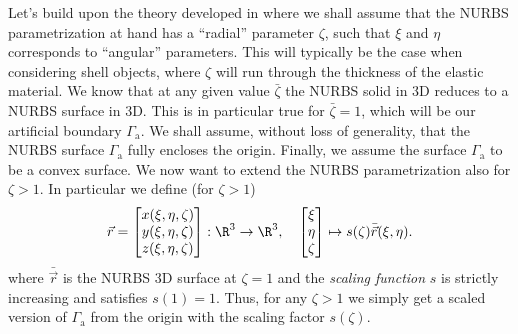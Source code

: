 Let's build upon the theory developed in  where we shall assume that the NURBS parametrization at hand has a ``radial'' parameter $\zeta$, such that $\xi$ and $\eta$ corresponds to ``angular'' parameters. This will typically be the case when considering shell objects, where $\zeta$ will run through the thickness of the elastic material. We know that at any given value $\bar{\zeta}$ the NURBS solid in 3D reduces to a NURBS surface in 3D. This is in particular true for $\bar{\zeta} = 1$, which will be our artificial boundary $\Gamma_{\mathrm{a}}$. We shall assume, without loss of generality, that the NURBS surface $\Gamma_{\mathrm{a}}$ fully encloses the origin. Finally, we assume the surface $\Gamma_{\mathrm{a}}$ to be a convex surface. We now want to extend the NURBS parametrization also for $\zeta > 1$. In particular we define (for $\zeta>1$)
\begin{equation*}
	\vec{r} = \begin{bmatrix}
	x(\xi, \eta, \zeta)\\
	y(\xi, \eta, \zeta)\\
	z(\xi, \eta, \zeta)
\end{bmatrix} :	 \R^3\to\R^3, \quad  \begin{bmatrix}
	\xi\\
	\eta\\
	\zeta
	\end{bmatrix}\mapsto s(\zeta)\bar{\vec{r}}(\xi, \eta).
\end{equation*}
where $\bar{\vec{r}}$ is the NURBS 3D surface at $\zeta = 1$ and the \textit{scaling function} $s$ is strictly increasing and satisfies $s(1) = 1$. Thus, for any $\zeta > 1$ we simply get a scaled version of $\Gamma_{\mathrm{a}}$ from the origin with the scaling factor $s(\zeta)$.

